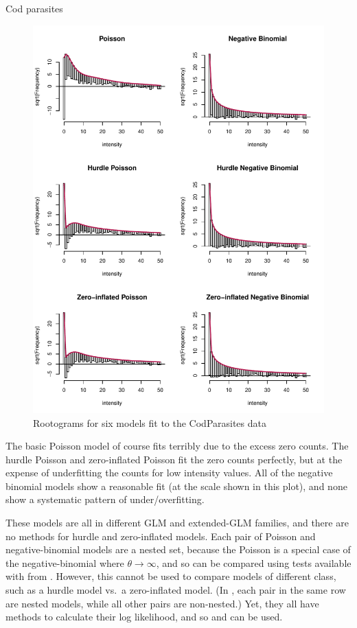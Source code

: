 \documentclass[11pt]{book}\usepackage[]{graphicx}\usepackage[]{color}
\newenvironment{knitrout}{}{} %
\renewenvironment{knitrout}{\small\renewcommand{\baselinestretch}{.85}}{} %
\begin{document}
\begin{Example}[cod2]{Cod parasites}
\begin{knitrout}
\begin{figure}[!htbp]
\centerline{\includegraphics[width=.8\textwidth]{ch09/fig/cod2-rootograms} }

\caption[Rootograms for six models fit to the CodParasites data]{Rootograms for six models fit to the CodParasites data\label{fig:cod2-rootograms}}
\end{figure}


\end{knitrout}
The basic Poisson model of course fits terribly due to the excess zero counts.
The hurdle Poisson and zero-inflated Poisson fit the zero counts perfectly, but
at the expense of underfitting the counts for low intensity values.
All of the negative binomial models show a reasonable fit (at the scale shown in this plot),
and none show a systematic pattern of under/overfitting.

These models are all in different GLM and extended-GLM families, and there are no
 methods for hurdle and zero-inflated models.
Each pair of
Poisson and negative-binomial models are a nested set, because the
Poisson is a special case of the negative-binomial where $\theta \rightarrow \infty$,
and so can be compared using \LR tests available with  from .
However, this cannot be used to compare models of different class,
such as a hurdle model vs.\ a zero-inflated model.
(In , each pair in the same row are nested models,
while all other pairs are non-nested.)
Yet, they all have 
methods to calculate their log likelihood, and so  and 
can be used.  


\end{Example}
\end{document}
